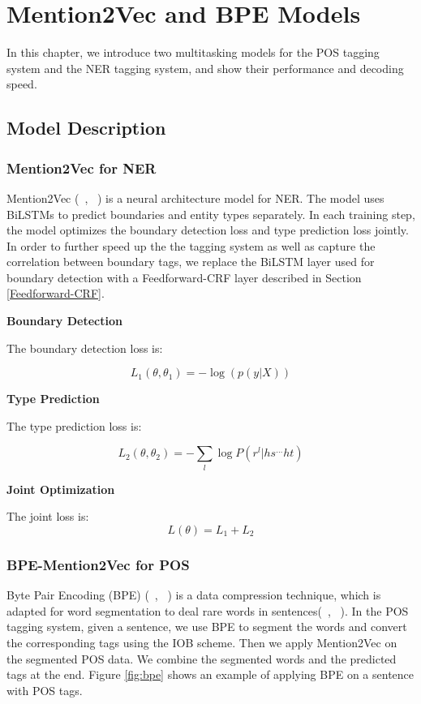 \documentclass{sfuthesis}
\begin{document}
\chapter{Mention2Vec and BPE Models}
In this chapter, we introduce two multitasking models for the POS tagging system and the NER tagging system, and show their performance and decoding speed. 
\section{Model Description}
\subsection{Mention2Vec for NER}
Mention2Vec (~\citeauthor{stratos2016mention2vec}, ~\citeyear{stratos2016mention2vec}) is a neural architecture model for NER. The model uses BiLSTMs to predict boundaries and entity types separately. In each training step, the model optimizes the boundary detection loss and type prediction loss jointly.  In order to further speed up the the tagging system as well as capture the correlation between boundary tags, we replace the BiLSTM layer used for boundary detection with a Feedforward-CRF layer described in Section \ref{Feedforward-CRF}.

\textbf{Boundary Detection} 

The boundary detection loss is:

\begin{equation}
  L_{1}\left( \theta ,\theta _{1}\right) =-\log \left( p\left( y|X\right) \right) 
\end{equation}

\textbf{Type Prediction}

The type prediction loss is:

\begin{equation}
  L_{2}\left( \theta ,\theta _{2}\right) =-\sum _{l}\log P\left( r^{l}|hs^{\ldots }ht\right)
\end{equation}

\textbf{Joint Optimization}

The joint loss is:
\begin{equation}
  L\left( \theta \right) =L_{1}+L_{2}  
\end{equation}

\subsection{BPE-Mention2Vec for POS}
Byte Pair Encoding (BPE) (~\citeauthor{gage1994new}, ~\citeyear{gage1994new}) is a data compression technique, which is adapted for word segmentation to deal rare words in sentences(~\citeauthor{sennrich2015neural}, ~\citeyear{sennrich2015neural}). In the POS tagging system, given a sentence, we use BPE to segment the words and convert the corresponding tags using the IOB scheme. Then we apply Mention2Vec on the segmented POS data. We combine the segmented words and the predicted tags at the end. Figure \ref{fig:bpe} shows an example of applying BPE on a sentence with POS tags. 
\end{document}
